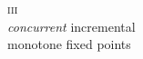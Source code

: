 \documentclass[aspectratio=141,dvipsnames]{beamer}
\newcommand\standout{\color{standout}}
\providecommand\displayfamily\rmfamily
\providecommand\strong[1]{{\bfseries#1}}
\newcommand\naive{na\"ive}
\newcommand\interlude{\Huge\standout\displayfamily}
\begin{document}







  \begin{frame}
    \interlude
    \begin{center}
      {\upshape\scshape iii}
      \\
      \emph{concurrent} incremental
      \\
      monotone fixed points
    \end{center}
  \end{frame}
\end{document}
